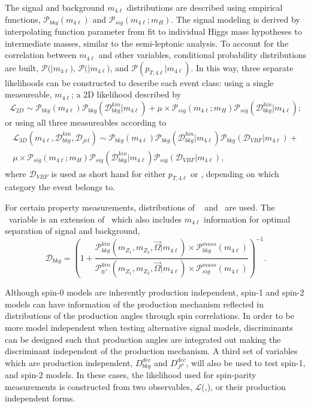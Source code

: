 The signal and background 
$m_{4\ell}$ distributions are described using empirical functions, 
$\mathscr{P}_{bkg}(m_{4\ell})$ and $\mathscr{P}_{sig}(m_{4\ell};m_{H})$.  
The signal modeling is derived by interpolating function parameter
from fit to individual Higgs mass hypotheses to intermediate masses,
similar to the semi-leptonic analysis. 
To account for the correlation between $m_{4\ell}$ and other
variables, conditional probability distributions are built, 
$\mathscr{P}($\KD$|m_{4\ell})$, $\mathscr{P}($\Djet$|m_{4\ell})$,
and $\mathscr{P}(p_{T,4\ell}|m_{4\ell})$.  
In this way,
three separate likelihoods can be constructed to describe 
each event class: using a single measureable, $m_{4\ell}$;
a 2D likelihood described by
\begin{equation}
\mathscr{L}_{2D}\sim\mathscr{P}_{bkg}(m_{4\ell})\mathscr{P}_{bkg}(\mathscr{D}_{bkg}^{kin}|m_{4\ell})+\mu\times\mathscr{P}_{sig}(m_{4\ell};m_H)\mathscr{P}_{sig}(\mathscr{D}_{bkg}^{kin}|m_{4\ell});
\end{equation}
or using all three measureables according to
\begin{equation}
\begin{split}
\mathscr{L}_{3D}(m_{4\ell},\mathscr{D}^{kin}_{bkg},\mathscr{D}_{jet})\sim\mathscr{P}_{bkg}(m_{4\ell})\mathscr{P}_{bkg}(\mathscr{D}^{kin}_{bkg}|m_{4\ell})\mathscr{P}_{bkg}(\mathscr{D}_{VBF}|m_{4\ell})+ \\
\mu\times\mathscr{P}_{sig}(m_{4\ell};m_H)\mathscr{P}_{sig}(\mathscr{D}^{kin}_{bkg}|m_{4\ell})\mathscr{P}_{sig}(\mathscr{D}_{VBF}|m_{4\ell}),
\end{split}
\end{equation}
where $\mathscr{D}_{VBF}$ is used as short hand for either $p_{T,4\ell}$ or \Djet, 
depending on which category the event belongs to. 

For certain property measurements, distributions of \spinKD~
and \superKD~are used.  The \superKD~variable is an extension
of \KD~which also includes $m_{4\ell}$ information for optimal 
separation of signal and background,
\begin{equation}
\mathscr{D}_{bkg}=\left(1+\frac{\mathscr{P}^{kin}_{bkg}(m_{Z_1},m_{Z_2},\vec{\Omega}|m_{4\ell})\times\mathscr{P}^{mass}_{bkg}(m_{4\ell})}{\mathscr{P}^{kin}_{0^+}(m_{Z_1},m_{Z_2},\vec{\Omega}|m_{4\ell})\times\mathscr{P}^{mass}_{sig}(m_{4\ell})}\right)^{-1}.
\end{equation}

Although spin-0 models are
inherently production independent, spin-1 and spin-2 models
can have information of the production mechanism reflected in 
distributions of the production angles through spin correlations.
In order to be more model independent when testing alternative
signal models, discriminants can be designed such that production
angles are integrated out making the discriminant independent 
of the production mechanism.  A third set of variables which 
are production independent, $D_{bkg}^{dec}$ and $D_{J^P}^{dec}$,
will also be used to test spin-1, and spin-2 models.
In these cases, the likelihood used for spin-parity measurements 
is constructed 
from two observables, $\mathscr{L}$(\superKD,\spinKD), or 
their production independent forms. 

